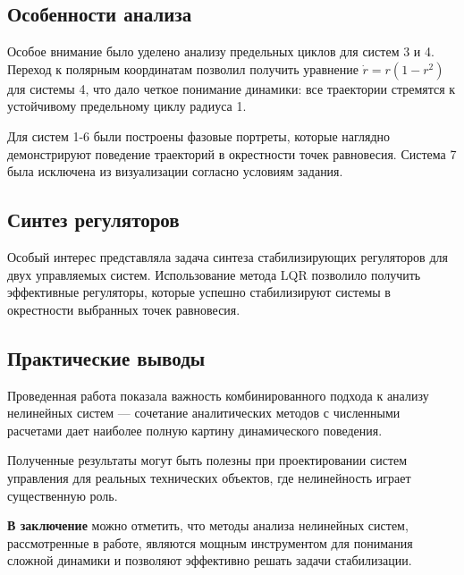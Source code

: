 \subsection*{Особенности анализа}

Особое внимание было уделено анализу предельных циклов для систем 3 и 4. Переход к полярным координатам позволил получить уравнение $\dot{r} = r(1-r^2)$ для системы 4, что дало четкое понимание динамики: все траектории стремятся к устойчивому предельному циклу радиуса 1.

Для систем 1-6 были построены фазовые портреты, которые наглядно демонстрируют поведение траекторий в окрестности точек равновесия. Система 7 была исключена из визуализации согласно условиям задания.

\subsection*{Синтез регуляторов}

Особый интерес представляла задача синтеза стабилизирующих регуляторов для двух управляемых систем. Использование метода LQR позволило получить эффективные регуляторы, которые успешно стабилизируют системы в окрестности выбранных точек равновесия.

\subsection*{Практические выводы}

Проведенная работа показала важность комбинированного подхода к анализу нелинейных систем --- сочетание аналитических методов с численными расчетами дает наиболее полную картину динамического поведения.

Полученные результаты могут быть полезны при проектировании систем управления для реальных технических объектов, где нелинейность играет существенную роль.

\textbf{В заключение} можно отметить, что методы анализа нелинейных систем, рассмотренные в работе, являются мощным инструментом для понимания сложной динамики и позволяют эффективно решать задачи стабилизации.
